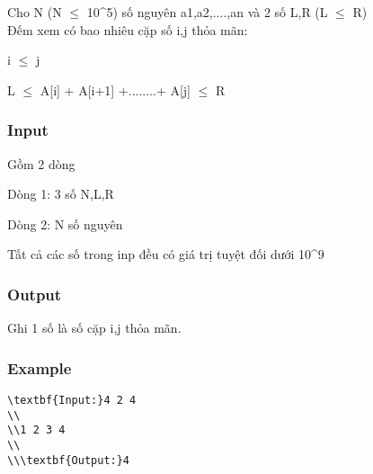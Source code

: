 



    Cho N (N $\le$ 10\textasciicircum5) số nguyên a1,a2,....,an và 2 số L,R (L $\le$ R)    
\\



    Đếm xem có bao nhiêu cặp số i,j thỏa mãn:   



    i  $\le$  j   



    L $\le$  A[i] + A[i+1] +........+ A[j]  $\le$ R   

\subsubsection{   Input  }

    Gồm 2 dòng   

    Dòng 1: 3 số N,L,R   

    Dòng 2: N số nguyên   

    Tất cả các số trong inp đều có giá trị tuyệt đối dưới 10\textasciicircum9    
\\

\subsubsection{   Output  }

    Ghi 1 số là số cặp i,j thỏa mãn.   

\subsubsection{   Example  }
\begin{verbatim}
\textbf{Input:}4 2 4
\\
\\1 2 3 4
\\
\\\textbf{Output:}4\end{verbatim}
